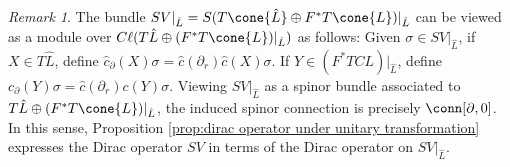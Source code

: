 \documentclass[12pt, reqno]{amsart}
\theoremstyle{plain} %
\theoremstyle{definition}
\theoremstyle{remark}
\newtheorem{remark}[theorem]{Remark}
\numberwithin{equation}{section}
\newcommand{\dom}[1]{\hat{#1}}
\newcommand{\cbar}[1]{\dom{c}\left(#1\right)}
\newcommand{\Cl}{C\ell}
\begin{document}
\begin{remark}
    The bundle \(SV|_{\dom{L}} = S(T\cone{\dom{L}} \oplus F^*T\cone{L})|_{\dom{L}}\) can be viewed as a module over \(\Cl(T\dom{L} \oplus (F^*T\cone{L})|_{\dom{L}})\) as follows: Given \(\sigma \in SV|_{\dom{L}}\), if \(X \in T\dom{L}\), define \(\dom{c}_\partial(X) \sigma = \cbar{\partial_r} \cbar{X} \sigma\).
    If \(Y \in (F^*TCL)|_{\dom{L}}\), define \(c_\partial(Y) \sigma = \cbar{\partial_r} c(Y) \sigma\).
    Viewing \(SV|_{\dom{L}}\) as a spinor bundle associated to \(T\dom{L} \oplus (F^*T\cone{L})|_{\dom{L}}\), the induced spinor connection is precisely \(\conn[\partial, 0]\).
    In this sense, Proposition \ref{prop:dirac operator under unitary transformation} expresses the Dirac operator \(SV\) in terms of the Dirac operator on \(SV|_{\dom{L}}\).
\end{remark}
\end{document}
